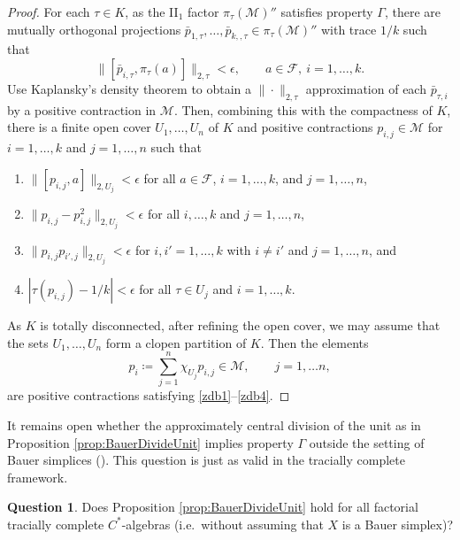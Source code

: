 \documentclass[a4paper,11pt]{amsart}
\theoremstyle{definition}
\newtheorem{question}[theorem]{Question}
\renewcommand{\labelenumi}{\theenumi}
\renewcommand{\theenumi}{\rm{(\roman{enumi})}}
\numberwithin{equation}{section}
\numberwithin{theorem}{section}
\begin{document}
\begin{proof}
   For each $\tau \in K$, as the II$_1$ factor $\pi_\tau(\mathcal M)''$ satisfies property $\Gamma$, there are mutually orthogonal projections $\bar p_{1, \tau}, \ldots, \bar p_{k, ,\tau} \in \pi_\tau(\mathcal M)''$ with trace $1/k$ such that
   \begin{equation}
       \|[\bar p_{i, \tau}, \pi_\tau(a)]\|_{2, \tau} < \epsilon, \qquad a \in \mathcal F,\ i = 1, \ldots, k.
   \end{equation}
   Use Kaplansky's density theorem to obtain a $\|\cdot\|_{2,\tau}$ approximation of each $\bar p_{\tau, i}$ by a positive contraction in $\mathcal M$.
   Then, combining this with the compactness of $K$, there is a finite open cover $U_1, \ldots, U_n$ of $K$ and positive contractions $p_{i, j} \in \mathcal M$ for $i =1, \ldots, k$ and $j = 1, \ldots, n$ such that 
    \begin{enumerate}
    \renewcommand{\labelenumi}{\theenumi}
    \renewcommand{\theenumi}{\rm{(\roman{enumi}$'$)}}
    
       \item\label{lzdb1} $\|[p_{i, j}, a]\|_{2, U_j} < \epsilon$ for all $a \in \mathcal F$, $i = 1, \ldots, k$, and $j = 1, \ldots, n$,
       \item\label{lzdb2} $\|p_{i, j} - p_{i, j}^2\|_{2, U_j} < \epsilon$ for all $i, \ldots, k$ and $j= 1, \ldots, n$,
       \item\label{lzdb3} $\|p_{i,j} p_{i',j}\|_{2, U_j} < \epsilon$ for $i, i' = 1,\ldots,k$ with $i \neq i'$ and $j = 1, \ldots, n$, and
       \item\label{lzdb4} $|\tau(p_{i,j}) - 1/k| < \epsilon$ for all $\tau \in U_j$ and $i = 1, \ldots, k$.
   \end{enumerate}

   As $K$ is totally disconnected, after refining the open cover, we may assume that the sets $U_1, \ldots, U_n$ form a clopen partition of $K$.  Then the elements
   \begin{equation}
        p_i \coloneqq \sum_{j=1}^n \chi_{U_j} p_{i, j} \in \mathcal M, \qquad j = 1, \ldots n,
   \end{equation}
   are positive contractions satisfying \ref{zdb1}--\ref{zdb4}.
\end{proof}


It remains open whether the approximately central division of the unit as in Proposition \ref{prop:BauerDivideUnit} implies property $\Gamma$ outside the setting of Bauer simplices (\cite[Question 3.5]{CETW}). This question is just as valid in the tracially complete framework.
\begin{question}
    Does Proposition \ref{prop:BauerDivideUnit} hold for all factorial tracially complete $C^*$-algebras (i.e.\ without assuming that $X$ is a Bauer simplex)?
\end{question}
\end{document}
